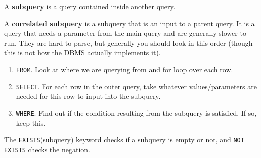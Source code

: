     \begin{definition}[Subquery]
      \label{def:subquery}
      A \textbf{subquery} is a query contained inside another query. 
    \end{definition}

    \begin{definition}
      \label{def:correlated-subqueries}
      A \textbf{correlated subquery} is a subquery that is an input to a parent query. It is a query that needs a parameter from the main query and are generally slower to run. They are hard to parse, but generally you should look in this order (though this is not how the DBMS actually implements it). 
      \begin{enumerate}
        \item \texttt{FROM}. Look at where we are querying from and for loop over each row. 
        \item \texttt{SELECT}. For each row in the outer query, take whatever values/parameters are needed for this row to input into the subquery. 
        \item \texttt{WHERE}. Find out if the condition resulting from the subquery is satisfied. If so, keep this. 
      \end{enumerate}
    \end{definition}

    \begin{definition}
      \label{def:exists}
      The \texttt{EXISTS}(subquery) keyword checks if a subquery is empty or not, and \texttt{NOT EXISTS} checks the negation. 
    \end{definition}

